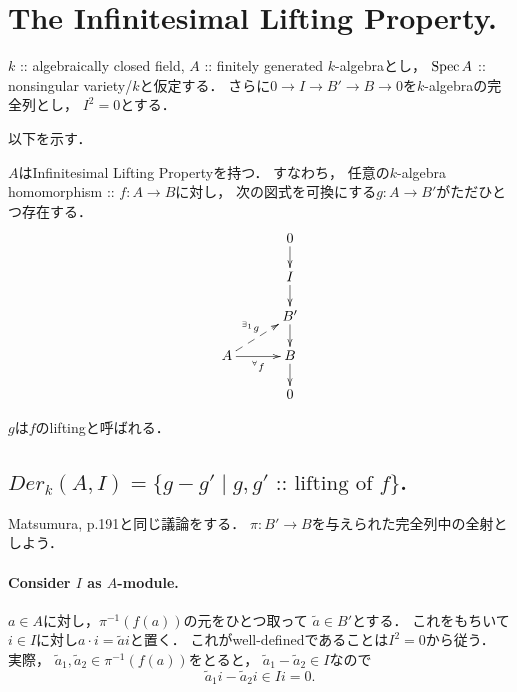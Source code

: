 \documentclass[a4paper]{jsarticle}
\begin{document}
\section{The Infinitesimal Lifting Property.} %
    $k$ :: algebraically closed field,
    $A$ :: finitely generated $k$-algebraとし，
    $\operatorname{Spec} A$ :: nonsingular variety/$k$と仮定する．
    さらに$0 \to I \to B' \to B \to 0$を$k$-algebraの完全列とし，
    $I^2=0$とする．

    以下を示す．
    \begin{Thm}
        $A$はInfinitesimal Lifting Propertyを持つ．
        すなわち，
        任意の$k$-algebra homomorphism :: $f: A \to B$に対し，
        次の図式を可換にする$g: A \to B'$がただひとつ存在する．
        \[
        \xymatrix@R=15pt@C=30pt
        {
            {} & 0 \ar[d]\\
            {} & I \ar[d]\\
            {} & B'\ar[d]\\
            A \ar[r]_-{{}^{\forall} f} \ar@{-->}[ru]^{{}^{\exists_1} g}& B \ar[d]\\
            {} & 0 \\
        }
        \]
    \end{Thm}
    $g$は$f$のliftingと呼ばれる．
    
    \subsection{$Der_k(A,I)=\{ g-g' \mid g,g' \text{ :: lifting of }f\}$.}
    Matsumura, p.191と同じ議論をする．
    $\pi: B' \to B$を与えられた完全列中の全射としよう．

    \paragraph{Consider $I$ as $A$-module.}
    $a \in A$に対し，$\pi^{-1}(f(a))$の元をひとつ取って
    $\tilde{a} \in B'$とする．
    これをもちいて$i \in I$に対し$a \cdot i=\tilde{a}i$と置く．
    これがwell-definedであることは$I^2=0$から従う．
    実際，
    $\tilde{a}_1, \tilde{a}_2 \in \pi^{-1}(f(a))$をとると，
    $\tilde{a}_1-\tilde{a}_2 \in I$なので
    \[ \tilde{a}_1 i-\tilde{a}_2 i \in I i=0. \]
\end{document}
